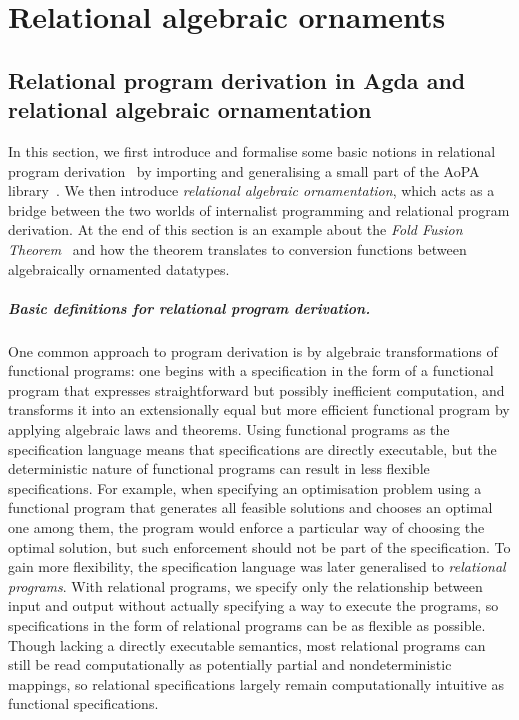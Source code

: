 \chapter{Relational algebraic ornaments}
\label{chap:algebraic}

\section{Relational program derivation in Agda and relational algebraic ornamentation}
\label{sec:relations}

In this section, we first introduce and formalise some basic notions in relational program derivation~\cite{Bird-AoP} by importing and generalising a small part of the AoPA library~\cite{Mu-AoPA}.
We then introduce \emph{relational algebraic ornamentation}, which acts as a bridge between the two worlds of internalist programming and relational program derivation.
At the end of this section is an example about the \emph{Fold Fusion Theorem}~\cite[Section~6.2]{Bird-AoP} and how the theorem translates to conversion functions between algebraically ornamented datatypes.

\paragraph{Basic definitions for relational program derivation.}
One common approach to program derivation is by algebraic transformations of functional programs: one begins with a specification in the form of a functional program that expresses straightforward but possibly inefficient computation, and transforms it into an extensionally equal but more efficient functional program by applying algebraic laws and theorems.
Using functional programs as the specification language means that specifications are directly executable, but the deterministic nature of functional programs can result in less flexible specifications.
For example, when specifying an optimisation problem using a functional program that generates all feasible solutions and chooses an optimal one among them, the program would enforce a particular way of choosing the optimal solution, but such enforcement should not be part of the specification.
To gain more flexibility, the specification language was later generalised to \emph{relational programs}.
With relational programs, we specify only the relationship between input and output without actually specifying a way to execute the programs, so specifications in the form of relational programs can be as flexible as possible.
Though lacking a directly executable semantics, most relational programs can still be read computationally as potentially partial and nondeterministic mappings, so relational specifications largely remain computationally intuitive as functional specifications.

